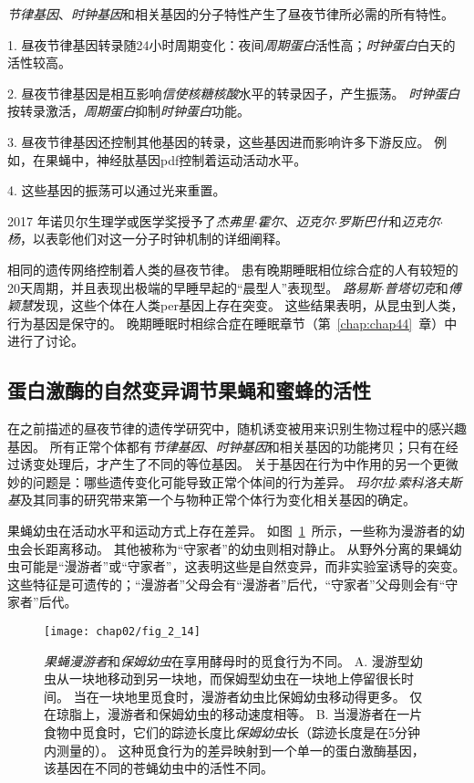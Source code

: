 \textit{节律基因}、\textit{时钟基因}和相关基因的分子特性产生了昼夜节律所必需的所有特性。

1. 昼夜节律基因转录随24小时周期变化：夜间\textit{周期蛋白}活性高；\textit{时钟蛋白}白天的活性较高。


2. 昼夜节律基因是相互影响\textit{信使核糖核酸}水平的转录因子，产生振荡。
\textit{时钟蛋白}按转录激活，\textit{周期蛋白}抑制\textit{时钟蛋白}功能。


3. 昼夜节律基因还控制其他基因的转录，这些基因进而影响许多下游反应。
例如，在果蝇中，神经肽基因pdf控制着运动活动水平。


4. 这些基因的振荡可以通过光来重置。



2017 年诺贝尔生理学或医学奖授予了\textit{杰弗里$\cdot$霍尔}、\textit{迈克尔$\cdot$罗斯巴什}和\textit{迈克尔$\cdot$杨}，以表彰他们对这一分子时钟机制的详细阐释。


相同的遗传网络控制着人类的昼夜节律。
患有晚期睡眠相位综合症的人有较短的20天周期，并且表现出极端的早睡早起的“晨型人”表现型。
\textit{路易斯$\cdot$普塔切克}和\textit{傅颖慧}发现，这些个体在人类per基因上存在突变。
这些结果表明，从昆虫到人类，行为基因是保守的。
晚期睡眠时相综合症在睡眠章节（第~\ref{chap:chap44}~章）中进行了讨论。



\subsection{蛋白激酶的自然变异调节果蝇和蜜蜂的活性}

在之前描述的昼夜节律的遗传学研究中，随机诱变被用来识别生物过程中的感兴趣基因。
所有正常个体都有\textit{节律基因}、\textit{时钟基因}和相关基因的功能拷贝；只有在经过诱变处理后，才产生了不同的等位基因。
关于基因在行为中作用的另一个更微妙的问题是：哪些遗传变化可能导致正常个体间的行为差异。
\textit{玛尔拉$\cdot$索科洛夫斯基}及其同事的研究带来第一个与物种正常个体行为变化相关基因的确定。




果蝇幼虫在活动水平和运动方式上存在差异。
如图~\ref{fig:2_14}~所示，一些称为漫游者的幼虫会长距离移动。
其他被称为“守家者”的幼虫则相对静止。
从野外分离的果蝇幼虫可能是“漫游者”或“守家者”，这表明这些是自然变异，而非实验室诱导的突变。
这些特征是可遗传的；“漫游者”父母会有“漫游者”后代，“守家者”父母则会有“守家者”后代。


\begin{figure}[htbp]
	\centering
	\texttt{[image: chap02/fig\_2\_14]}
	\caption{\textit{果蝇漫游者}和\textit{保姆幼虫}在享用酵母时的觅食行为不同\cite{sokolowski2001drosophila}。
		A. 漫游型幼虫从一块地移动到另一块地，而保姆型幼虫在一块地上停留很长时间。
		当在一块地里觅食时，漫游者幼虫比保姆幼虫移动得更多。
		仅在琼脂上，漫游者和保姆幼虫的移动速度相等。
		B. 当漫游者在一片食物中觅食时，它们的踪迹长度比\textit{保姆幼虫}长（踪迹长度是在5分钟内测量的）。
		这种觅食行为的差异映射到一个单一的蛋白激酶基因，该基因在不同的苍蝇幼虫中的活性不同。}
	\label{fig:2_14}
\end{figure}


